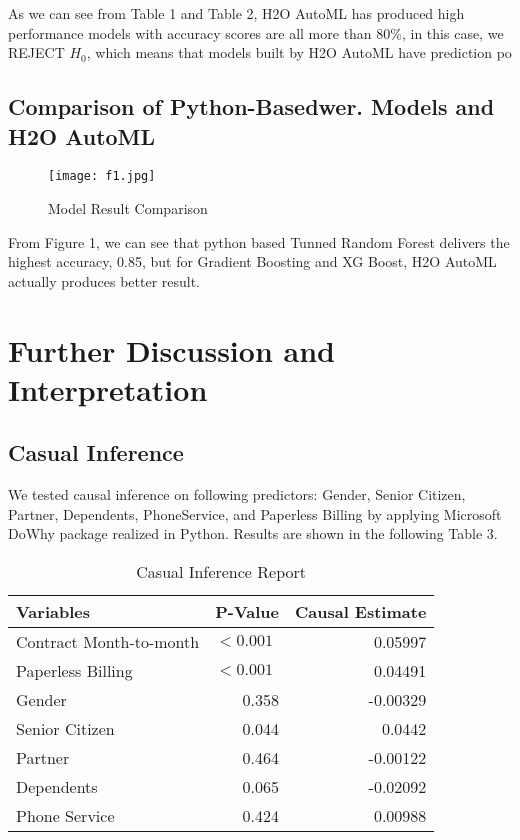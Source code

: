 \documentclass[12pt]{article}
\begin{document}
As we can see from Table 1 and Table 2, H2O AutoML has produced high performance models with accuracy scores are all more than 80\%, in this case, we REJECT $H_0$, which means that models built by H2O AutoML have prediction po
\subsection{Comparison of Python-Basedwer.
 Models and H2O AutoML}
\begin{figure}[H]
\centering
\texttt{[image: f1.jpg]}
\caption{Model Result Comparison}\label{fig:}
\end{figure}

From Figure 1, we can see that python based Tunned Random Forest delivers the highest accuracy, 0.85, but for Gradient Boosting and XG Boost, H2O AutoML actually produces better result.

\section{Further Discussion and Interpretation} \label{sec:Interpretation}
\subsection{Casual Inference} \label{sec:Casuality}

We tested causal inference on following predictors: Gender, Senior Citizen, Partner, Dependents, PhoneService, and Paperless Billing by applying Microsoft DoWhy package realized in Python. Results are shown in the following Table 3. 
\begin{table}[htbp]
  \centering
  \caption{Casual Inference Report }
    \begin{tabular}{lrr}
    \toprule
    Variables                          & \multicolumn{1}{l}{  P-Value } & \multicolumn{1}{l}{ Causal Estimate } \\
    \midrule
     Contract Month-to-month            & \multicolumn{1}{l}{ $<0.001$   } & 0.05997 \\
     Paperless Billing                  & \multicolumn{1}{l}{ $<0.001$   } & 0.04491 \\
     Gender                             & 0.358 & -0.00329 \\
     Senior Citizen                     & 0.044 & 0.0442 \\
     Partner                            & 0.464 & -0.00122 \\
     Dependents                         & 0.065 & -0.02092 \\
     Phone Service                      & 0.424 & 0.00988 \\
    \bottomrule
    \end{tabular}%
  \label{tab:addlabel}%
\end{table}%
\end{document}
